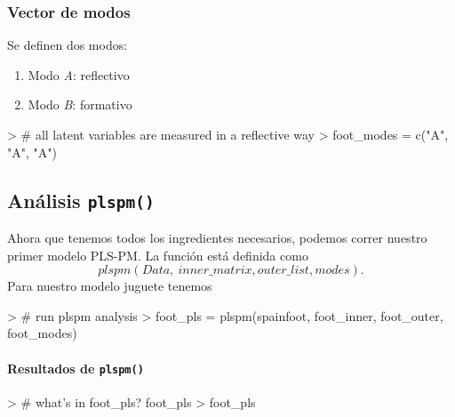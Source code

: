 \documentclass{paper}
\begin{document}
\subsubsection{Vector de modos}

Se definen dos modos:
\begin{enumerate}
  \item Modo {\em A}: reflectivo
  \item Modo {\em B}: formativo
\end{enumerate}

\begin{Schunk}
\begin{Sinput}
> # all latent variables are measured in a reflective way
> foot_modes = c("A", "A", "A")
\end{Sinput}
\end{Schunk}

\subsection{An\'alisis \texttt{plspm()}}

Ahora que tenemos todos los ingredientes necesarios, podemos correr nuestro primer modelo PLS-PM. La funci\'on est\'a definida como
\begin{displaymath}
plspm(Data,~inner\_ matrix, outer \_ list, modes).
\end{displaymath}
Para nuestro modelo juguete tenemos
\begin{Schunk}
\begin{Sinput}
> # run plspm analysis
> foot_pls = plspm(spainfoot, foot_inner, foot_outer, foot_modes)
\end{Sinput}
\end{Schunk}

\paragraph{Resultados de \texttt{plspm()}}

\begin{Schunk}
\begin{Sinput}
> # what's in foot_pls? foot_pls
> foot_pls
\end{Sinput}
\end{Schunk}
\end{document}
